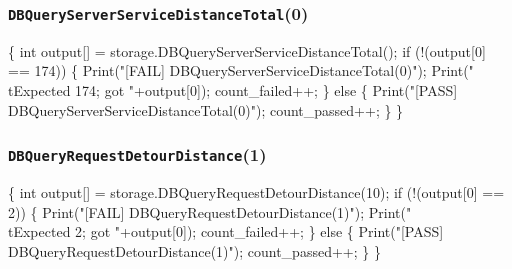 \documentclass{article}
\def\nwendcode{\endtrivlist \endgroup}
\let\nwdocspar=\par
\begin{document}
\subsubsection{{\tt{}DBQueryServerServiceDistanceTotal}(0)}
\nwenddocs{}\endmoddef{}
\{
  int output[] = storage.DBQueryServerServiceDistanceTotal();
  if (!(output[0] == 174)) \{
    Print("[FAIL] DBQueryServerServiceDistanceTotal(0)");
    Print("\\tExpected 174; got "+output[0]);
    count_failed++;
  \} else \{
    Print("[PASS] DBQueryServerServiceDistanceTotal(0)");
    count_passed++;
  \}
\}
\nwendcode{}\nwdocspar
\subsubsection{{\tt{}DBQueryRequestDetourDistance}(1)}
\nwenddocs{}\endmoddef{}
\{
  int output[] = storage.DBQueryRequestDetourDistance(10);
  if (!(output[0] == 2)) \{
    Print("[FAIL] DBQueryRequestDetourDistance(1)");
    Print("\\tExpected 2; got "+output[0]);
    count_failed++;
  \} else \{
    Print("[PASS] DBQueryRequestDetourDistance(1)");
    count_passed++;
  \}
\}
\nwendcode{}\nwdocspar
\end{document}
